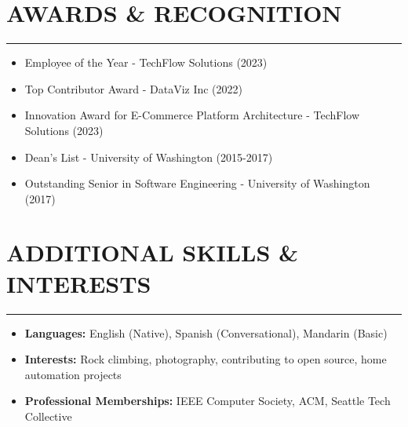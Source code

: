 \documentclass[a4paper,10pt]{article}           %
\begin{document}
    \section*{AWARDS \& RECOGNITION}
    \vspace{-0.5em}
    \hrule
    \vspace{0.3cm}
    \begin{itemize}[leftmargin=0.2cm, itemsep=0pt, label=--]
        \item Employee of the Year - TechFlow Solutions (2023)
        \item Top Contributor Award - DataViz Inc (2022)
        \item Innovation Award for E-Commerce Platform Architecture - TechFlow Solutions (2023)
        \item Dean's List - University of Washington (2015-2017)
        \item Outstanding Senior in Software Engineering - University of Washington (2017)
    \end{itemize}

    \section*{ADDITIONAL SKILLS \& INTERESTS}
    \vspace{-0.5em}
    \hrule
    \vspace{0.3cm}
    \begin{itemize}[leftmargin=0.2cm, itemsep=0pt, label=--]
        \item \textbf{Languages:} English (Native), Spanish (Conversational), Mandarin (Basic)
        \item \textbf{Interests:} Rock climbing, photography, contributing to open source, home automation projects
        \item \textbf{Professional Memberships:} IEEE Computer Society, ACM, Seattle Tech Collective
    \end{itemize}
\end{document}
